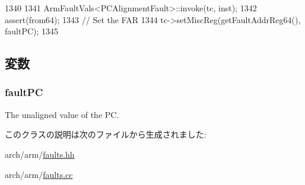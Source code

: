 \begin{DoxyCode}
1340 {
1341     ArmFaultVals<PCAlignmentFault>::invoke(tc, inst);
1342     assert(from64);
1343     // Set the FAR
1344     tc->setMiscReg(getFaultAddrReg64(), faultPC);
1345 }
\end{DoxyCode}


\subsection{変数}
\hypertarget{classArmISA_1_1PCAlignmentFault_af8e1c40a0f10f0875e5ce4a62fdc3d7f}{
\subsubsection[{faultPC}]{ {\bf faultPC}}}
\label{classArmISA_1_1PCAlignmentFault_af8e1c40a0f10f0875e5ce4a62fdc3d7f}


The unaligned value of the PC. 

このクラスの説明は次のファイルから生成されました:\begin{DoxyCompactItemize}
\item 
arch/arm/\hyperlink{arch_2arm_2faults_8hh}{faults.hh}\item 
arch/arm/\hyperlink{arch_2arm_2faults_8cc}{faults.cc}\end{DoxyCompactItemize}

